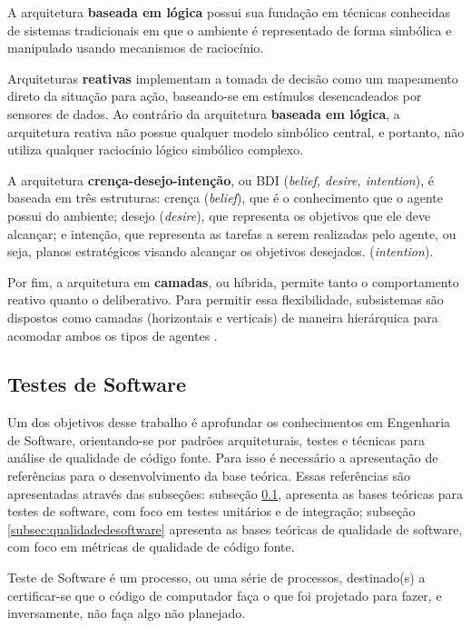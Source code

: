 A arquitetura \textbf{baseada em lógica} possui sua fundação em técnicas conhecidas de sistemas tradicionais em que o ambiente é representado de forma simbólica e manipulado usando mecanismos de raciocínio\cite{fabio2007}.

Arquiteturas \textbf{reativas} implementam a tomada de decisão como um mapeamento direto da situação para ação, baseando-se em estímulos desencadeados por sensores de dados. Ao contrário da arquitetura \textbf{baseada em lógica}, a arquitetura reativa não possue qualquer modelo simbólico central, e portanto, não utiliza qualquer raciocínio lógico simbólico complexo\cite{fabio2007}.

A arquitetura \textbf{crença-desejo-intenção}, ou BDI (\textit{belief, desire, intention}), é baseada em três estruturas: crença (\textit{belief}), que é o conhecimento que o agente possui do ambiente; desejo (\textit{desire}), que representa os objetivos que ele deve alcançar; e intenção,  que representa as tarefas a serem realizadas pelo agente, ou seja, planos estratégicos visando alcançar os objetivos desejados. (\textit{intention})\cite{fabio2007}.

Por fim, a arquitetura em \textbf{camadas}, ou híbrida, permite tanto o comportamento reativo quanto o deliberativo. Para permitir essa flexibilidade, subsistemas são dispostos como camadas (horizontais e verticais) de maneira hierárquica para acomodar ambos os tipos de agentes \cite{fabio2007}.

  \subsection{Testes de Software}
  \label{subsec:testedesoftware}

Um dos objetivos desse trabalho é aprofundar os conhecimentos em Engenharia de
Software, orientando-se por padrões arquiteturais, testes e técnicas para análise
de qualidade de código fonte. Para isso é necessário a apresentação de
referências para o desenvolvimento da base teórica. Essas referências
são apresentadas através das subseções: subseção \ref{subsec:testedesoftware},
apresenta as bases teóricas para testes de software, com foco em testes unitários
e de integração; subseção \ref{subsec:qualidadedesoftware} apresenta as bases
teóricas de qualidade de software, com foco em métricas de qualidade de código
fonte.

Teste de Software é um processo, ou uma série de processos, destinado(s) a certificar-se que o código de computador faça o que foi projetado para fazer, e inversamente, não faça algo não planejado\cite{myers2011}.

